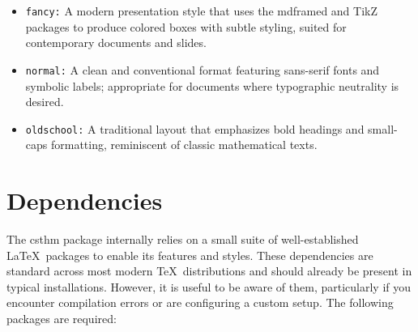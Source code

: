 \documentclass[10pt,letterpaper]{amsart}
\begin{document}
\begin{itemize}[label={--}]
	\item\texttt{fancy:} A modern presentation style that uses the \textsf{mdframed} and \textsf{TikZ} packages to produce colored boxes with subtle styling, suited for contemporary documents and slides.
	\item\texttt{normal:} A clean and conventional format featuring sans-serif fonts and symbolic labels; appropriate for documents where typographic neutrality is desired.
	\item\texttt{oldschool:} A traditional layout that emphasizes bold headings and small-caps formatting, reminiscent of classic mathematical texts.
\end{itemize}

\section{Dependencies}

The \textsf{csthm} package internally relies on a small suite of
well-established \LaTeX\ packages to enable its features and styles. These
dependencies are standard across most modern \TeX\ distributions and should
already be present in typical installations. However, it is useful to be aware
of them, particularly if you encounter compilation errors or are configuring a
custom setup. The following packages are required:
\end{document}
